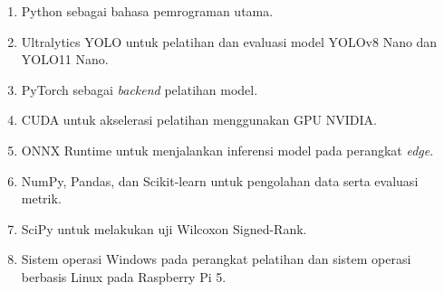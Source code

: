 \begin{sectioncontent}
\begin{subsectioncontent}
        \begin{enumerate}[leftmargin=0.75cm,label=\arabic*.]
            \item Python sebagai bahasa pemrograman utama.
            \item Ultralytics YOLO untuk pelatihan dan evaluasi model YOLOv8 Nano dan YOLO11 Nano.
            \item PyTorch sebagai \textit{backend} pelatihan model.
            \item CUDA untuk akselerasi pelatihan menggunakan GPU NVIDIA.
            \item ONNX Runtime untuk menjalankan inferensi model pada perangkat \textit{edge}.
            \item NumPy, Pandas, dan Scikit-learn untuk pengolahan data serta evaluasi metrik.
            \item SciPy untuk melakukan uji Wilcoxon Signed-Rank.
            \item Sistem operasi Windows pada perangkat pelatihan dan sistem operasi berbasis Linux pada Raspberry Pi 5.
        \end{enumerate}
    \end{subsectioncontent}
\end{sectioncontent}
